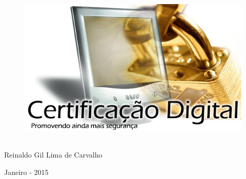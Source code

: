 \thispagestyle{empty}

\begin{center}
  \begin{figure}[H]
    \begin{center}
      \hspace{-1cm}
      \includegraphics[width=0.55\columnwidth]{titlepage}
  ~\cite{FrontPageIMG}
    \end{center}      
  \end{figure}

  \vskip 2cm

  \hspace{-1cm}
  \begin{minipage}[c]{12cm}
    \begin{center}

{\Huge {}\vskip 0.15cm

{\large Reinaldo Gil Lima de Carvalho}
}
    \end{center}
  \end{minipage}

  \vskip 14cm

  {\Huge Janeiro - 2015}

\end{center}
